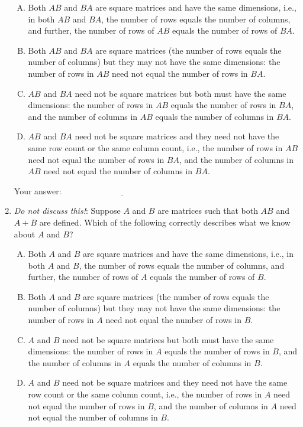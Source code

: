 \documentclass[10pt]{amsart}
\begin{document}
\begin{enumerate}
  \begin{enumerate}[(A)]
  \item Both $AB$ and $BA$ are square matrices and have the same
    dimensions, i.e., in both $AB$ and $BA$, the number of rows equals
    the number of columns, and further, the number of rows of $AB$
    equals the number of rows of $BA$.
  \item Both $AB$ and $BA$ are square matrices (the number of rows
    equals the number of columns) but they may not have the same
    dimensions: the number of rows in $AB$ need not equal the number of
    rows in $BA$.
  \item $AB$ and $BA$ need not be square matrices but both must have
    the same dimensions: the number of rows in $AB$ equals the number
    of rows in $BA$, and the number of columns in $AB$ equals the
    number of columns in $BA$.
  \item $AB$ and $BA$ need not be square matrices and they need not
    have the same row count or the same column count, i.e., the number
    of rows in $AB$ need not equal the number of rows in $BA$, and the
    number of columns in $AB$ need not equal the number of columns in
    $BA$.
  \end{enumerate}

  \vspace{0.1in}
  Your answer: $\underline{\qquad\qquad\qquad\qquad\qquad\qquad\qquad}$
  \vspace{0.1in}

\item {\em Do not discuss this!}: Suppose $A$ and $B$ are matrices
  such that both $AB$ and $A + B$ are defined. Which of the following
  correctly describes what we know about $A$ and $B$?

  \begin{enumerate}[(A)]
  \item Both $A$ and $B$ are square matrices and have the same
    dimensions, i.e., in both $A$ and $B$, the number of rows equals
    the number of columns, and further, the number of rows of $A$
    equals the number of rows of $B$.
  \item Both $A$ and $B$ are square matrices (the number of rows
    equals the number of columns) but they may not have the same
    dimensions: the number of rows in $A$ need not equal the number of
    rows in $B$.
  \item $A$ and $B$ need not be square matrices but both must have
    the same dimensions: the number of rows in $A$ equals the number
    of rows in $B$, and the number of columns in $A$ equals the
    number of columns in $B$.
  \item $A$ and $B$ need not be square matrices and they need not have
    the same row count or the same column count, i.e., the number of
    rows in $A$ need not equal the number of rows in $B$, and the
    number of columns in $A$ need not equal the number of columns in
    $B$.
  \end{enumerate}


\end{enumerate}
\end{document}

